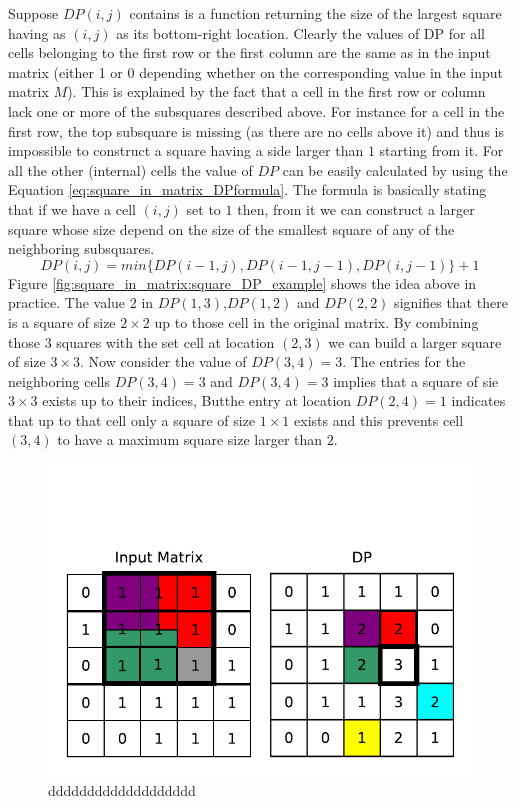 Suppose $DP(i,j)$ contains is a function returning the size of the largest square having as $(i,j)$
as its bottom-right location. Clearly the values of DP for all cells belonging to the first row or
the first column are the same as in the input matrix (either 1 or 0 depending whether on the
corresponding value in the input matrix $M$). This is explained by the fact that a cell in the first
row or column lack one or more of the subsquares described above. For instance for a cell in the
first row, the top subsquare is missing (as there are no cells above it) and thus is impossible to
construct a square having a side larger than $1$ starting from it. For all the other (internal)
cells the value of $DP$ can be easily calculated by using the Equation
\ref{eq:square_in_matrix_DPformula}. The formula is basically stating that if we have a cell $(i,j)$
set to $1$ then, from it we can construct a larger square whose size depend on the size of the
smallest square of any of the neighboring subsquares.
\begin{equation}
	\label{eq:square_in_matrix_DPformula}
	DP(i,j) = min\{DP(i-1,j),DP(i-1,j-1), DP(i,j-1)\} +1
\end{equation}
Figure \ref{fig:square_in_matrix:square_DP_example} shows the idea above in practice. The value $2$ in $DP(1,3)$,$DP(1,2)$ and $DP(2,2)$  signifies that 
there is a square of size $2\times 2$ up to those cell in the original matrix. By combining those $3$ squares with the set cell at location $(2,3)$ 
we can build a larger square of size $3\times 3$.
Now consider the value of $DP(3,4)=3$. The entries for the neighboring cells $DP(3,4)=3$ and $DP(3,4)=3$ implies that a square of sie $3\times 3$ exists up to their indices, Butthe entry at location 
$DP(2,4)=1$ indicates that up to that cell only a square of size $1\times 1$ exists and this prevents cell $(3,4)$ to have a maximum square size larger than $2$.

\begin{figure}
	\centering
	\label{fig:square_in_matrix:square_matrix_diagonal}
	\includegraphics[]{sources/square_in_matrix/images/square_DP_example}
	\caption{ddddddddddddddddddd }
\end{figure}

